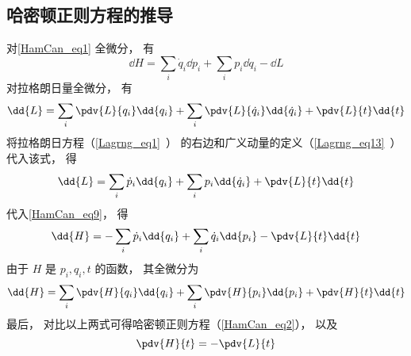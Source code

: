 \subsection{哈密顿正则方程的推导}
对\autoref{HamCan_eq1} 全微分， 有
\begin{equation}\label{HamCan_eq9}
\dd{H} = \sum_i \dot q_i \dd{p_i} + \sum_i p_i \dd{\dot q_i} - \dd{L}
\end{equation}
对拉格朗日量全微分， 有
\begin{equation}
\dd{L} = \sum_i \pdv{L}{q_i}\dd{q_i} + \sum_i \pdv{L}{\dot q_i}\dd{\dot q_i} + \pdv{L}{t}\dd{t}
\end{equation}
将拉格朗日方程（\autoref{Lagrng_eq1}~） 的右边和广义动量的定义（\autoref{Lagrng_eq13}~） 代入该式， 得
\begin{equation}
\dd{L} = \sum_i \dot p_i\dd{q_i} + \sum_i p_i\dd{\dot q_i} + \pdv{L}{t}\dd{t}
\end{equation}
代入\autoref{HamCan_eq9}， 得
\begin{equation}
\dd{H} = - \sum_i \dot p_i \dd{q_i} + \sum_i \dot q_i \dd{p_i}  - \pdv{L}{t}\dd{t}
\end{equation}
由于 $H$ 是 $p_i, q_i, t$ 的函数， 其全微分为 
\begin{equation}
\dd{H} = \sum_i \pdv{H}{q_i}\dd{q_i} + \sum_i \pdv{H}{p_i}\dd{p_i} + \pdv{H}{t}\dd{t}
\end{equation}
最后， 对比以上两式可得哈密顿正则方程（\autoref{HamCan_eq2}）， 以及
\begin{equation}
\pdv{H}{t} = - \pdv{L}{t}
\end{equation}
